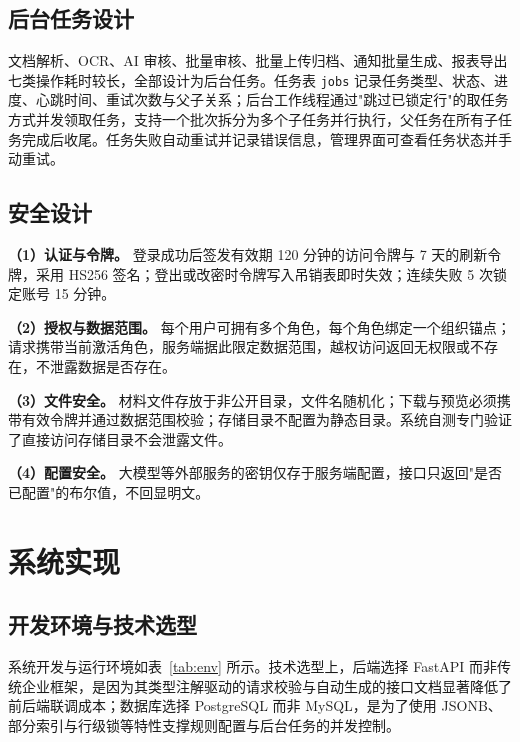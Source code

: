 \documentclass[12pt,a4paper]{ctexart}
\begin{document}
\subsection{后台任务设计}

文档解析、OCR、AI 审核、批量审核、批量上传归档、通知批量生成、报表导出七类操作耗时较长，全部设计为后台任务。任务表 \texttt{jobs} 记录任务类型、状态、进度、心跳时间、重试次数与父子关系；后台工作线程通过"跳过已锁定行"的取任务方式并发领取任务，支持一个批次拆分为多个子任务并行执行，父任务在所有子任务完成后收尾。任务失败自动重试并记录错误信息，管理界面可查看任务状态并手动重试。

\subsection{安全设计}

\textbf{（1）认证与令牌。} 登录成功后签发有效期 120 分钟的访问令牌与 7 天的刷新令牌，采用 HS256 签名；登出或改密时令牌写入吊销表即时失效；连续失败 5 次锁定账号 15 分钟。

\textbf{（2）授权与数据范围。} 每个用户可拥有多个角色，每个角色绑定一个组织锚点；请求携带当前激活角色，服务端据此限定数据范围，越权访问返回无权限或不存在，不泄露数据是否存在。

\textbf{（3）文件安全。} 材料文件存放于非公开目录，文件名随机化；下载与预览必须携带有效令牌并通过数据范围校验；存储目录不配置为静态目录。系统自测专门验证了直接访问存储目录不会泄露文件。

\textbf{（4）配置安全。} 大模型等外部服务的密钥仅存于服务端配置，接口只返回"是否已配置"的布尔值，不回显明文。

\clearpage
\section{系统实现}

\subsection{开发环境与技术选型}

系统开发与运行环境如表~\ref{tab:env} 所示。技术选型上，后端选择 FastAPI 而非传统企业框架，是因为其类型注解驱动的请求校验与自动生成的接口文档显著降低了前后端联调成本；数据库选择 PostgreSQL 而非 MySQL，是为了使用 JSONB、部分索引与行级锁等特性支撑规则配置与后台任务的并发控制。
\end{document}
